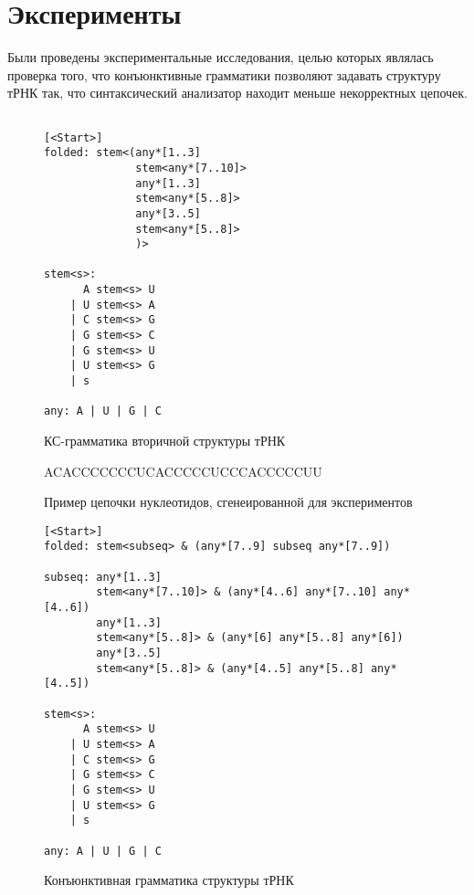 \section{Эксперименты}

Были проведены экспериментальные исследования, целью которых являлась проверка того, что конъюнктивные грамматики позволяют задавать структуру тРНК так, что синтаксический анализатор находит меньше некорректных цепочек.

\begin{figure}[h]
\begin{center}
\begin{verbatim}

[<Start>]
folded: stem<(any*[1..3] 
              stem<any*[7..10]> 
              any*[1..3] 
              stem<any*[5..8]> 
              any*[3..5] 
              stem<any*[5..8]>
              )>

stem<s>: 
      A stem<s> U
    | U stem<s> A
    | C stem<s> G
    | G stem<s> C
    | G stem<s> U
    | U stem<s> G
    | s

any: A | U | G | C

\end{verbatim}
\caption{КС-грамматика вторичной структуры тРНК}
\label{TRNAgrammar}
\end{center}
\end{figure}


\begin{figure}
\begin{center}
ACACCCCCCCUCACCCCCUCCCACCCCCUU
\end{center}
\caption{Пример цепочки нуклеотидов, сгенеированной для экспериментов}
\label{rnachain}
\end{figure}


\begin{figure}
\begin{center}
\begin{verbatim}
[<Start>]
folded: stem<subseq> & (any*[7..9] subseq any*[7..9])

subseq: any*[1..3] 
        stem<any*[7..10]> & (any*[4..6] any*[7..10] any*[4..6])
        any*[1..3] 
        stem<any*[5..8]> & (any*[6] any*[5..8] any*[6])
        any*[3..5] 
        stem<any*[5..8]> & (any*[4..5] any*[5..8] any*[4..5])
        
stem<s>:
      A stem<s> U
    | U stem<s> A
    | C stem<s> G
    | G stem<s> C
    | G stem<s> U
    | U stem<s> G
    | s

any: A | U | G | C

\end{verbatim}
\caption{Конъюнктивная грамматика структуры тРНК}
\label{TRNAgrammarConj}
\end{center}
\end{figure}


